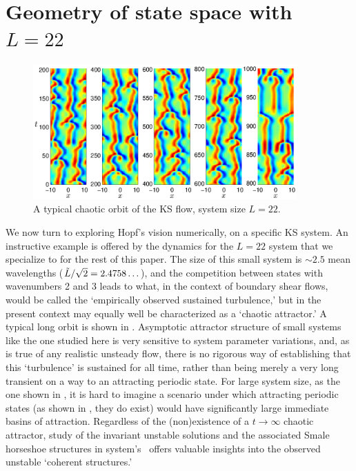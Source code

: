 
\section{Geometry of state space with $L=22$}
\label{sec:L22}

\begin{figure}[t]
\begin{center}
\includegraphics[width=0.9\textwidth, clip=true]{figs/ks_L22_long_orbit.eps}
\end{center}
\caption{
A typical chaotic orbit of the KS flow, system size $L=22$.
     } \label{f:ks_L22}
\end{figure}
We now turn to exploring Hopf's vision
numerically, on a specific KS system.
An instructive example is offered by the dynamics for
the  $L=22$  system
that we specialize to for the rest of this paper.
The size of this
small system is $\sim 2.5$ mean wavelengths
($\tilde{L}/\sqrt{2}= 2.4758\ldots$),
and the competition between states with wavenumbers 2 and 3
leads to
what, in the context of boundary shear flows, would be
called the `empirically observed sustained
turbulence,' but in the present context may equally well be
characterized as a `chaotic attractor.' A typical long orbit
is shown in .
Asymptotic attractor structure of small systems like
the one studied here
is very sensitive to system parameter variations, and,
as is true of
any realistic unsteady flow, there is no rigorous way of
establishing that this `turbulence' is sustained for all time,
rather than being
merely a very long transient on a way to an
attracting periodic state.
For large system size, as the one shown in , it is
hard to imagine a scenario under which attracting periodic states
(as shown in , they do exist) would have significantly
large immediate basins of attraction.
Regardless of the
(non)existence of a $t \to \infty$ chaotic attractor, study
of the invariant unstable solutions and the associated Smale
horseshoe structures in system's \statesp\ offers valuable
insights into the observed unstable `coherent structures.'

